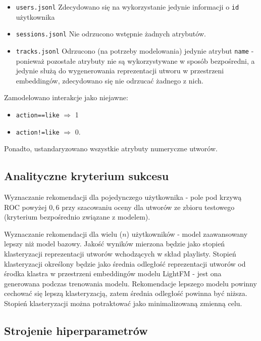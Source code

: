 \documentclass[10pt,a4paper]{article}
\begin{document}
\begin{itemize}
\item \texttt{users.jsonl}
    \subitem Zdecydowano się na wykorzystanie jedynie informacji o \texttt{id} użytkownika
\item \texttt{sessions.jsonl}
    \subitem Nie odrzucono wstępnie żadnych atrybutów.
\item \texttt{tracks.jsonl}
    \subitem Odrzucono (na potrzeby modelowania) jedynie atrybut \texttt{name} - ponieważ pozostałe atrybuty nie są wykorzystywane w sposób bezpośredni, a jedynie służą do wygenerowania reprezentacji utworu w przestrzeni embeddingów, zdecydowano się nie odrzucać żadnego z nich.
\end{itemize}

Zamodelowano interakcje jako niejawne:
\begin{itemize}
    \item \texttt{action==like} $\Rightarrow$ 1
    \item \texttt{action!=like} $\Rightarrow$ 0.
\end{itemize}

Ponadto, ustandaryzowano wszystkie atrybuty numeryczne utworów.

\subsection*{Analityczne kryterium sukcesu}

Wyznaczanie rekomendacji dla pojedynczego użytkownika - pole pod krzywą ROC powyżej $0,6$ przy szacowaniu oceny dla utworów ze zbioru testowego (kryterium bezpośrednio związane z modelem).

Wyznaczanie rekomendacji dla wielu ($n$) użytkowników - model zaawansowany lepszy niż model bazowy. Jakość wyników mierzona będzie jako stopień klasteryzacji reprezentacji utworów wchodzących w skład playlisty. Stopień klasteryzacji określony będzie jako średnia odległość reprezentacji utworów od środka klastra w przestrzeni embeddingów modelu LightFM - jest ona generowana podczas trenowania modelu. Rekomendacje lepszego modelu powinny cechować się lepszą klasteryzacją, zatem średnia odległość powinna być niższa. Stopień klasteryzacji można potraktować jako minimalizowaną zmienną celu.

\subsection*{Strojenie hiperparametrów}
\end{document}
